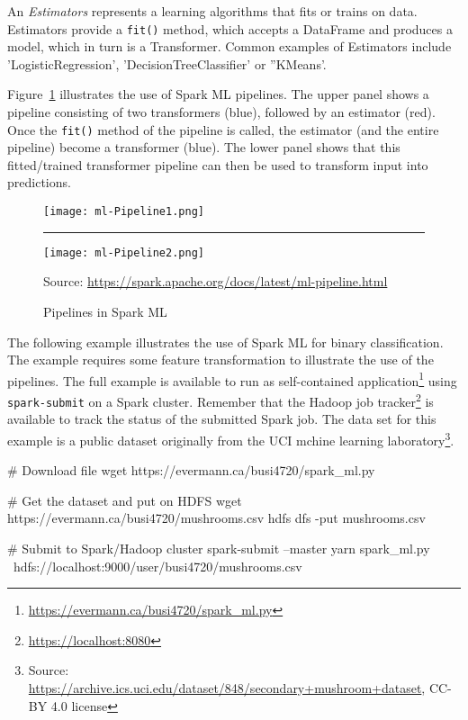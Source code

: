 An \emph{Estimators} represents a learning algorithms that fits or trains on data. Estimators provide a \texttt{fit()} method, which accepts a DataFrame and produces a model, which in turn is a Transformer. Common examples of Estimators include 'LogisticRegression', 'DecisionTreeClassifier' or ''KMeans'.

Figure~\ref{fig:sparkpipelines} illustrates the use of Spark ML pipelines. The upper panel shows a pipeline consisting of two transformers (blue), followed by an estimator (red). Once the \texttt{fit()} method of the pipeline is called, the estimator (and the entire pipeline) become a transformer (blue). The lower panel shows that this fitted/trained transformer pipeline can then be used to transform input into predictions. 

\begin{figure}
\centering

\texttt{[image: ml-Pipeline1.png]} 

\vspace{.5\baselineskip}
\rule{.75\textwidth}{.5pt}
\vspace{.5\baselineskip}

\texttt{[image: ml-Pipeline2.png]} 

\scriptsize Source: \url{https://spark.apache.org/docs/latest/ml-pipeline.html} \normalsize
\caption{Pipelines in Spark ML}
\label{fig:sparkpipelines}
\end{figure}

The following example illustrates the use of Spark ML for binary classification. The example requires some feature transformation to illustrate the use of the pipelines. The full example is available to run as self-contained application\footnote{\url{https://evermann.ca/busi4720/spark_ml.py}} using \texttt{spark-submit} on a Spark cluster. Remember that the Hadoop job tracker\footnote{\url{https://localhost:8080}} is available to track the status of the submitted Spark job. The data set for this example is a public dataset originally from the UCI mchine learning laboratory\footnote{Source: \url{https://archive.ics.uci.edu/dataset/848/secondary+mushroom+dataset}, CC-BY 4.0 license}.

\begin{bashcode}
# Download file
wget https://evermann.ca/busi4720/spark_ml.py

# Get the dataset and put on HDFS
wget https://evermann.ca/busi4720/mushrooms.csv
hdfs dfs -put mushrooms.csv

# Submit to Spark/Hadoop cluster
spark-submit --master yarn spark_ml.py \
    hdfs://localhost:9000/user/busi4720/mushrooms.csv
\end{bashcode}


